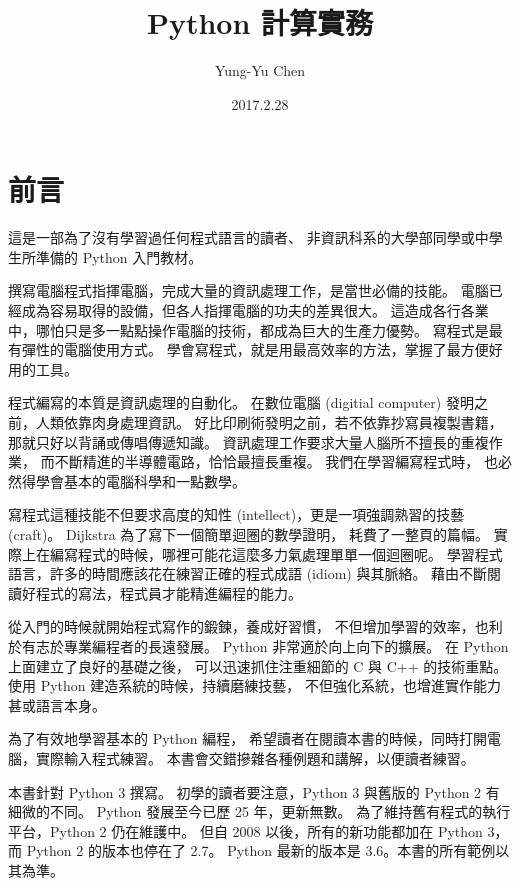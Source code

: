 \documentclass[a4paper,12pt]{book}
\theoremstyle{definition}
\begin{document}
\title{Python 計算實務}
\author{Yung-Yu Chen}
\date{2017.2.28}

\maketitle

\tableofcontents

\hspace{.5cm}

\frontmatter

\chapter{前言}

這是一部為了沒有學習過任何程式語言的讀者、
非資訊科系的大學部同學或中學生所準備的 Python 入門教材。

撰寫電腦程式指揮電腦，完成大量的資訊處理工作，是當世必備的技能。
電腦已經成為容易取得的設備，但各人指揮電腦的功夫的差異很大。
這造成各行各業中，哪怕只是多一點點操作電腦的技術，都成為巨大的生產力優勢。
寫程式是最有彈性的電腦使用方式。
學會寫程式，就是用最高效率的方法，掌握了最方便好用的工具。

程式編寫的本質是資訊處理的自動化。
在數位電腦 (digitial computer) 發明之前，人類依靠肉身處理資訊。
好比印刷術發明之前，若不依靠抄寫員複製書籍，那就只好以背誦或傳唱傳遞知識。
資訊處理工作要求大量人腦所不擅長的重複作業，
而不斷精進的半導體電路，恰恰最擅長重複。
我們在學習編寫程式時，
也必然得學會基本的電腦科學和一點數學。

寫程式這種技能不但要求高度的知性 (intellect)，更是一項強調熟習的技藝 (craft)。
Dijkstra 為了寫下一個簡單迴圈的數學證明，
耗費了一整頁的篇幅\cite{dahl_structured_1972}。
實際上在編寫程式的時候，哪裡可能花這麼多力氣處理單單一個迴圈呢。
學習程式語言，許多的時間應該花在練習正確的程式成語 (idiom) 與其脈絡。
藉由不斷閱讀好程式的寫法，程式員才能精進編程的能力。

從入門的時候就開始程式寫作的鍛鍊，養成好習慣，
不但增加學習的效率，也利於有志於專業編程者的長遠發展。
Python 非常適於向上向下的擴展。
在 Python 上面建立了良好的基礎之後，
可以迅速抓住注重細節的 C 與 C++ 的技術重點。
使用 Python 建造系統的時候，持續磨練技藝，
不但強化系統，也增進實作能力甚或語言本身。

為了有效地學習基本的 Python 編程，
希望讀者在閱讀本書的時候，同時打開電腦，實際輸入程式練習。
本書會交錯摻雜各種例題和講解，以便讀者練習。

本書針對 Python 3 撰寫。
初學的讀者要注意，Python 3 與舊版的 Python 2 有細微的不同。
Python 發展至今已歷 25 年，更新無數。
為了維持舊有程式的執行平台，Python 2 仍在維護中。
但自 2008 以後，所有的新功能都加在 Python 3，而 Python 2 的版本也停在了 2.7。
Python 最新的版本是 3.6。本書的所有範例以其為準。
\end{document}
